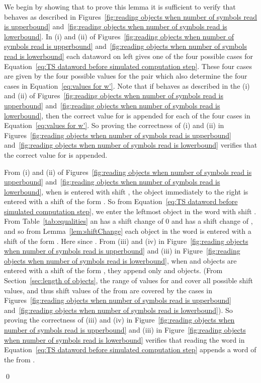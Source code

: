 \documentclass[11pt]{article} \usepackage{amsfonts,amsmath,amssymb,amsthm}
\renewenvironment{proof}{{\bfseries\noindent Proof.}}{\qed\vspace{3.5ex}}
\begin{document}
\begin{proof}
We begin by showing that to prove this lemma it is sufficient to verify that  behaves as described in Figures~\ref{fig:reading objects when number of symbols read is upperbound} and~\ref{fig:reading objects when number of symbols read is lowerbound}. 
In (i) and (ii) of Figures~\ref{fig:reading objects when number of symbols read is upperbound} and~\ref{fig:reading objects when number of symbols read is lowerbound} each dataword on left gives one of the four possible cases for Equation~\eqref{eq:TS dataword before simulated computation step}. 
These four cases are given by the four possible values for the pair  which also determine the four cases in Equation~\eqref{eq:values for w'}. 
Note that if  behaves as described in the (i) and (ii) of Figures~\ref{fig:reading objects when number of symbols read is upperbound} and~\ref{fig:reading objects when number of symbols read is lowerbound}, then the correct value for  is appended for each of the four cases in Equation~\eqref{eq:values for w'}.
So proving the correctness of (i) and (ii) in Figures~\ref{fig:reading objects when number of symbols read is upperbound} and~\ref{fig:reading objects when number of symbols read is lowerbound} verifies that the correct value for  is appended. 

From (i) and (ii) of Figures~\ref{fig:reading objects when number of symbols read is upperbound} and~\ref{fig:reading objects when number of symbols read is lowerbound}, when  is entered with shift , the object immediately to the right is entered with a shift of the form . 
So from Equation~\eqref{eq:TS dataword before simulated computation step}, we enter the leftmost object in the word  with shift . From Table~\ref{tab:equalities} an  has a shift change of 0 and  has a shift change of , and so from Lemma~\ref{lem:shiftChange} each object in the word  is entered with a shift of the form . Here  since . 
From (iii) and (iv) in Figure~\ref{fig:reading objects when number of symbols read is upperbound} and (iii) in Figure~\ref{fig:reading objects when number of symbols read is lowerbound}, when  and  objects are entered with a shift of the form , they append only  and  objects. 
(From Section~\ref{sec:length of objects}, the range of values for  and  cover all possible shift values, and thus shift values of the from  are covered by the cases in Figures~\ref{fig:reading objects when number of symbols read is upperbound} and~\ref{fig:reading objects when number of symbols read is lowerbound}). 
So proving the correctness of (iii) and (iv) in Figure~\ref{fig:reading objects when number of symbols read is upperbound} and (iii) in Figure~\ref{fig:reading objects when number of symbols read is lowerbound} verifies that reading the word  in Equation~\eqref{eq:TS dataword before simulated computation step} appends a word of the from . 


\end{proof}
\end{document}
